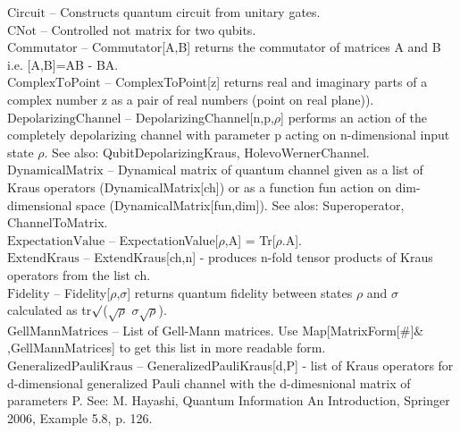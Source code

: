 \documentclass[a4paper,10pt]{scrartcl}
\begin{document}
\textbf{$ \text{Circuit} $ }-- Constructs quantum circuit from unitary gates.$  $\\

\textbf{$ \text{CNot} $ }-- Controlled not matrix for two qubits.$  $\\

\textbf{$ \text{Commutator} $ }-- Commutator[A,B] returns the commutator of matrices A and B i.e. [A,B]=AB - BA.$  $\\

\textbf{$ \text{ComplexToPoint} $ }-- ComplexToPoint[z] returns real and imaginary parts of a complex number z as a pair of real numbers (point on real plane)).$  $\\

\textbf{$ \text{DepolarizingChannel} $ }-- DepolarizingChannel[n,p,$\rho $] performs an action of the completely depolarizing channel with parameter p acting on n-dimensional input state $\rho $. See also: QubitDepolarizingKraus, HolevoWernerChannel.$  $\\

\textbf{$ \text{DynamicalMatrix} $ }-- Dynamical matrix of quantum channel given as a list of Kraus operators (DynamicalMatrix[ch]) or as a function fun action on dim-dimensional space (DynamicalMatrix[fun,dim]). See alos: Superoperator, ChannelToMatrix.$  $\\

\textbf{$ \text{ExpectationValue} $ }-- ExpectationValue[$\rho $,A] = Tr[$\rho $.A].$  $\\

\textbf{$ \text{ExtendKraus} $ }-- ExtendKraus[ch,n] - produces n-fold tensor products of Kraus operators from the list ch.$  $\\

\textbf{$ \text{Fidelity} $ }-- Fidelity[$\rho $,$\sigma $] returns quantum fidelity between states $\rho $ and $\sigma $ calculated as tr$\surd $($\surd \rho $ $\sigma \surd \rho $).$  $\\

\textbf{$ \text{GellMannMatrices} $ }-- List of Gell-Mann matrices. Use Map[MatrixForm[$\#$]$\&$,GellMannMatrices] to get this list in more readable form.$  $\\

\textbf{$ \text{GeneralizedPauliKraus} $ }-- GeneralizedPauliKraus[d,P] - list of Kraus operators for d-dimensional generalized Pauli channel with the d-dimesnional matrix of parameters P. See: M. Hayashi, Quantum Information An Introduction, Springer 2006, Example 5.8, p. 126.$  $\\
\end{document}
